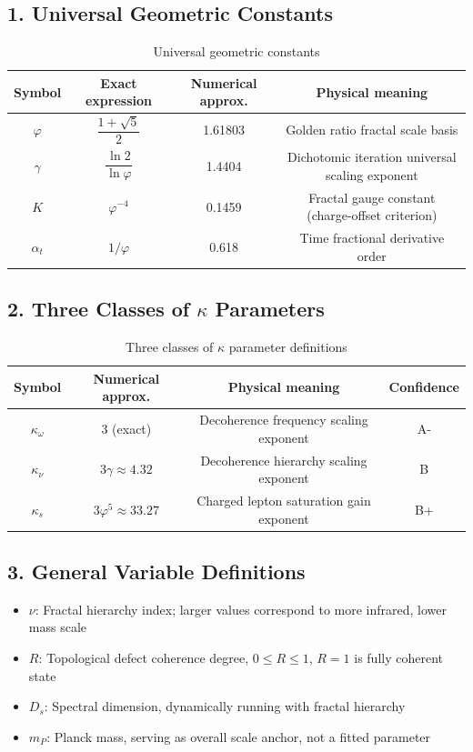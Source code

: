 \documentclass[12pt,a4paper,twocolumn]{article}
\renewcommand{\phi}{\varphi}
\begin{document}
\subsection*{1. Universal Geometric Constants}
\begin{table}[H]
\centering
\footnotesize
\caption{Universal geometric constants}
\begin{tabular}{c|c|c|c}
\hline
\textbf{Symbol} & \textbf{Exact expression} & \textbf{Numerical approx.} & \textbf{Physical meaning} \\
\hline
$\phi$ & $\dfrac{1+\sqrt{5}}{2}$ & 1.61803 & Golden ratio fractal scale basis \\
$\gamma$ & $\dfrac{\ln 2}{\ln \phi}$ & 1.4404 & Dichotomic iteration universal scaling exponent \\
$K$ & $\phi^{-4}$ & 0.1459 & Fractal gauge constant (charge-offset criterion) \\
$\alpha_t$ & $1/\phi$ & 0.618 & Time fractional derivative order \\
\hline
\end{tabular}
\end{table}

\subsection*{2. Three Classes of $\kappa$ Parameters}
\begin{table}[H]
\centering
\footnotesize
\caption{Three classes of $\kappa$ parameter definitions}
\begin{tabular}{c|c|c|c}
\hline
\textbf{Symbol} & \textbf{Numerical approx.} & \textbf{Physical meaning} & \textbf{Confidence} \\
\hline
$\kappa_\omega$ & 3 (exact) & Decoherence frequency scaling exponent & A- \\
$\kappa_\nu$ & $3\gamma \approx 4.32$ & Decoherence hierarchy scaling exponent & B \\
$\kappa_s$ & $3\phi^5 \approx 33.27$ & Charged lepton saturation gain exponent & B+ \\
\hline
\end{tabular}
\end{table}

\subsection*{3. General Variable Definitions}
\begin{itemize}
\item $\nu$: Fractal hierarchy index; larger values correspond to more infrared, lower mass scale
\item $R$: Topological defect coherence degree, $0 \le R \le 1$, $R=1$ is fully coherent state
\item $D_s$: Spectral dimension, dynamically running with fractal hierarchy
\item $m_P$: Planck mass, serving as overall scale anchor, not a fitted parameter
\end{itemize}
\end{document}
